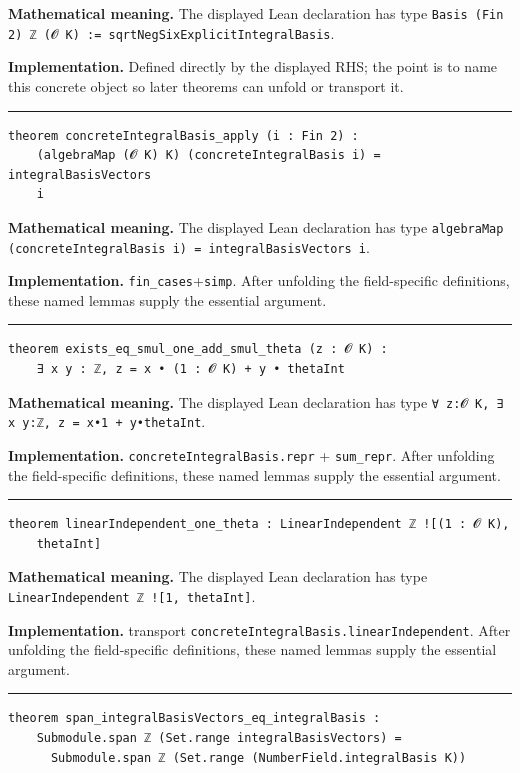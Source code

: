 \documentclass[UTF8,a4paper,11pt,fontset=fandol]{ctexart}
\theoremstyle{definition}
\newcommand{\statementsep}{\par\medskip\hrule\medskip}
\begin{document}
\noindent\textbf{Mathematical meaning.} The displayed Lean declaration has type \texttt{Basis (Fin 2) ℤ (𝓞 K) := sqrtNegSixExplicitIntegralBasis}.\par
\noindent\textbf{Implementation.} Defined directly by the displayed RHS; the point is to name this concrete object so later theorems can unfold or transport it.\par
\statementsep
\begin{verbatim}
theorem concreteIntegralBasis_apply (i : Fin 2) :
    (algebraMap (𝓞 K) K) (concreteIntegralBasis i) = integralBasisVectors
    i
\end{verbatim}
\noindent\textbf{Mathematical meaning.} The displayed Lean declaration has type \texttt{algebraMap (concreteIntegralBasis i) = integralBasisVectors i}.\par
\noindent\textbf{Implementation.} \texttt{fin\_\allowbreak{}cases}+\texttt{simp}. After unfolding the field-specific definitions, these named lemmas supply the essential argument.\par
\statementsep
\begin{verbatim}
theorem exists_eq_smul_one_add_smul_theta (z : 𝓞 K) :
    ∃ x y : ℤ, z = x • (1 : 𝓞 K) + y • thetaInt
\end{verbatim}
\noindent\textbf{Mathematical meaning.} The displayed Lean declaration has type \texttt{∀ z:𝓞 K, ∃ x y:ℤ, z = x•1 + y•thetaInt}.\par
\noindent\textbf{Implementation.} \texttt{concreteIntegralBasis.\allowbreak{}repr} + \texttt{sum\_\allowbreak{}repr}. After unfolding the field-specific definitions, these named lemmas supply the essential argument.\par
\statementsep
\begin{verbatim}
theorem linearIndependent_one_theta : LinearIndependent ℤ ![(1 : 𝓞 K),
    thetaInt]
\end{verbatim}
\noindent\textbf{Mathematical meaning.} The displayed Lean declaration has type \texttt{LinearIndependent ℤ ![1, thetaInt]}.\par
\noindent\textbf{Implementation.} transport \texttt{concreteIntegralBasis.\allowbreak{}linearIndependent}. After unfolding the field-specific definitions, these named lemmas supply the essential argument.\par
\statementsep
\begin{verbatim}
theorem span_integralBasisVectors_eq_integralBasis :
    Submodule.span ℤ (Set.range integralBasisVectors) =
      Submodule.span ℤ (Set.range (NumberField.integralBasis K))
\end{verbatim}
\end{document}

